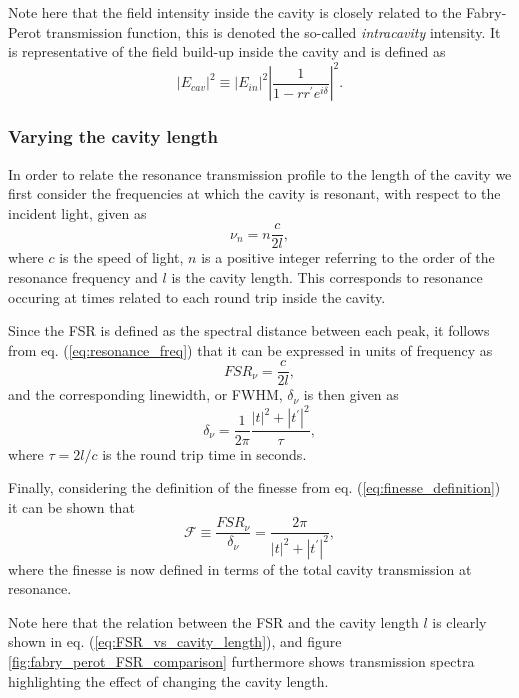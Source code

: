 Note here that the field intensity inside the cavity is closely related to the Fabry-Perot transmission function, this is denoted the so-called \emph{intracavity} intensity. It is representative of the field build-up inside the cavity and is defined as 
\begin{equation}
    |E_{cav}|^2 \equiv |E_{in}|^2 \left|\frac{1}{1-rr^{\prime}e^{i\delta}}\right|^2.
    \label{eq:intracavity_intensity}
\end{equation}

\subsubsection{Varying the cavity length}

In order to relate the resonance transmission profile to the length of the cavity we first consider the frequencies at which the cavity is resonant, with respect to the incident light, given as
\begin{equation}
    \nu_n = n \frac{c}{2l},
    \label{eq:resonance_freq}
\end{equation}
where $c$ is the speed of light, $n$ is a positive integer referring to the order of the resonance frequency and $l$ is the cavity length. This corresponds to resonance occuring at times related to each round trip inside the cavity. 

Since the FSR is defined as the spectral distance between each peak, it follows from eq. (\ref{eq:resonance_freq}) that it can be expressed in units of frequency as 
\begin{equation}
    FSR_{\nu} = \frac{c}{2l},
    \label{eq:FSR_vs_cavity_length}
\end{equation}
and the corresponding linewidth, or FWHM, $\delta_{\nu}$ is then given as
\begin{equation}
    \delta_{\nu} = \frac{1}{2 \pi} \frac{|t|^2 + |t^{\prime}|^2}{\tau},
\end{equation}
where $\tau = 2l/c$ is the round trip time in seconds. 

Finally, considering the definition of the finesse from eq. (\ref{eq:finesse_definition}) it can be shown that
\begin{equation}
    \mathcal{F} \equiv \frac{FSR_{\nu}}{\delta_{\nu}} = \frac{2 \pi}{|t|^2 + |t^{\prime}|^2},
    \label{eq:lossless_finesse}
\end{equation}
where the finesse is now defined in terms of the total cavity transmission at resonance. 

Note here that the relation between the FSR and the cavity length $l$ is clearly shown in eq. (\ref{eq:FSR_vs_cavity_length}), and figure \ref{fig:fabry_perot_FSR_comparison} furthermore shows transmission spectra highlighting the effect of changing the cavity length. 

